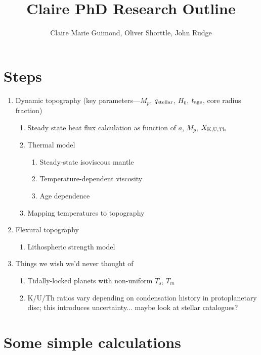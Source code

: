 \documentclass[10pt,a4paper]{article}
\author{Claire Marie Guimond, Oliver Shorttle, John Rudge}
\title{Claire PhD Research Outline}
\begin{document}
\maketitle

\section{Steps}
\begin{enumerate}
\item Dynamic topography (key parameters---$M_p$, $q_{\rm stellar}$, $H_0$, $t_{\rm age}$, core radius fraction) 
	\begin{enumerate}
	\item Steady state heat flux calculation as function of $a$, $M_p$, $X_{\rm K, U, Th}$
	\item Thermal model
	
		\begin{enumerate}
		
		\item Steady-state isoviscous mantle
		\item Temperature-dependent viscosity
		\item Age dependence
		\end{enumerate}
	\item Mapping temperatures to topography
	\end{enumerate}
		
\item Flexural topography
	\begin{enumerate}
	\item Lithospheric strength model
	\end{enumerate}
	
\item Things we wish we'd never thought of
	\begin{enumerate}
	\item Tidally-locked planets with non-uniform $T_s$, $T_m$
	\item K/U/Th ratios vary depending on condensation history in protoplanetary disc; this introduces uncertainty... maybe look at stellar catalogues?
	\end{enumerate}
	
\end{enumerate}
	
\section{Some simple calculations}
\end{document}
